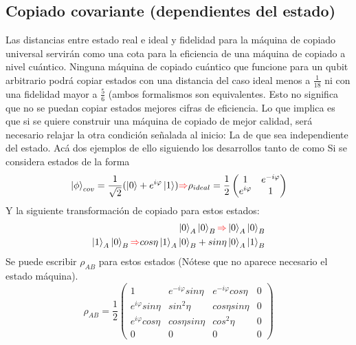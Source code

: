 \documentclass{book}
\begin{document}
\subsection{Copiado covariante (dependientes del estado)}
Las distancias entre estado real e ideal y fidelidad para la máquina de copiado universal servirán como una cota para la eficiencia de una máquina de copiado a nivel cuántico. Ninguna máquina de copiado cuántico que funcione para un qubit arbitrario podrá copiar estados con una distancia del caso ideal menos a $\frac{1}{18}$ ni con una fidelidad mayor a $\frac{5}{6}$ (ambos formalismos son equivalentes. 
Esto no significa que no se puedan copiar estados mejores cifras de eficiencia. Lo que implica es que si se quiere construir una máquina de copiado de mejor calidad, será necesario relajar la otra condición señalada al inicio: La de que sea independiente del estado. Acá dos ejemplos de ello siguiendo los desarrollos tanto de \textcolor{red}{\cite{bib1}} como \textcolor{red}{\cite{bib2}}
Si se considera estados de la forma 
\begin{equation}\label{eq2.32}{\ket{\phi}_{cov}=\frac{1}{\sqrt{2}}(\ket{0}+e^{i\varphi}\ket{1}) \textcolor{red}{\Rightarrow} \rho_{ideal}=\frac{1}{2} \begin{pmatrix} 1& e^{-i\varphi} \\ e^{i\varphi} & 1\end{pmatrix}}\end{equation}
Y la siguiente transformación de copiado para estos estados:
\begin{equation}\label{eq2.33}\begin{aligned}{\ket{0}_A\ket{0}_B\textcolor{red}{\Rightarrow} \ket{0}_A\ket{0}_B} \\  {\ket{1}_A\ket{0}_B\textcolor{red}{\Rightarrow} cos\eta\ket{1}_A\ket{0}_B+sin\eta\ket{0}_A\ket{1}_B}\end{aligned}\end{equation}
Se puede escribir $\rho_{AB}$ para estos estados (Nótese que no aparece necesario el estado máquina).
\begin{equation}\label{eq2.34}{\rho_{AB}=\frac{1}{2} \begin{pmatrix} 1 &e^{-i\varphi}sin\eta &e^{-i\varphi}cos\eta &0\\  e^{i\varphi}sin\eta& sin^2\eta & cos\eta sin\eta&0 \\ e^{i\varphi}cos\eta& cos\eta sin\eta & cos^2 \eta &0  \\ 0&0 & 0&0 \end{pmatrix}}\end{equation}
\end{document}
